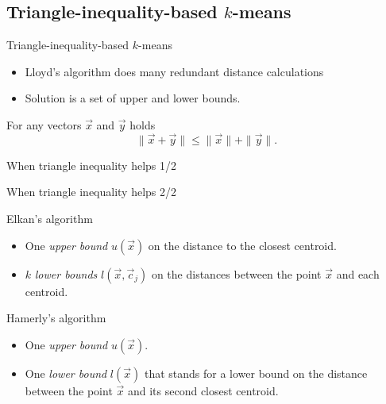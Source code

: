 \documentclass[10pt, compress]{beamer}
\newcommand{\x}{\vec{x}}
\newcommand{\cj}{\vec{c}_j}
\newcommand{\ux}{u(\x)}
\newcommand{\lxcj}{l(\x, \cj)}
\begin{document}
\subsection{Triangle-inequality-based \texorpdfstring{$k$}{k}-means}

\begin{frame}{Triangle-inequality-based \texorpdfstring{$k$}{k}-means}
  \begin{itemize}
    \item Lloyd's algorithm does many redundant distance calculations
    \item Solution is a set of upper and lower bounds.
  \end{itemize}
  \begin{theorem} \label{thm:triange}
    For any vectors $\vec{x}$ and $\vec{y}$ holds
    \begin{equation*}
       \| \vec{x} + \vec{y} \| \leq \|\vec{x}\| + \|\vec{y}\|.
    \end{equation*}
 \end{theorem}
\end{frame}

\begin{frame}{When triangle inequality helps 1/2}
  
\end{frame}

\begin{frame}{When triangle inequality helps 2/2}
  
\end{frame}

\begin{frame}{Elkan's algorithm}
  \begin{itemize}
    \item One \emph{upper bound} $\ux$ on the distance to the closest centroid.
    \item $k$ \emph{lower bounds} $\lxcj$ on the distances between the
      point $\x$ and each centroid.
  \end{itemize}
  \begin{center}
    
  \end{center}
\end{frame}

\begin{frame}{Hamerly's algorithm}
  \begin{itemize}
    \item One \emph{upper bound} $u(\vec{x})$.
    \item One \emph{lower bound} $l(\vec{x})$ that stands for a lower bound on the distance
      between the point $\vec{x}$ and its second closest centroid.
  \end{itemize}
  \begin{center}
    
  \end{center}
\end{frame}
\end{document}
